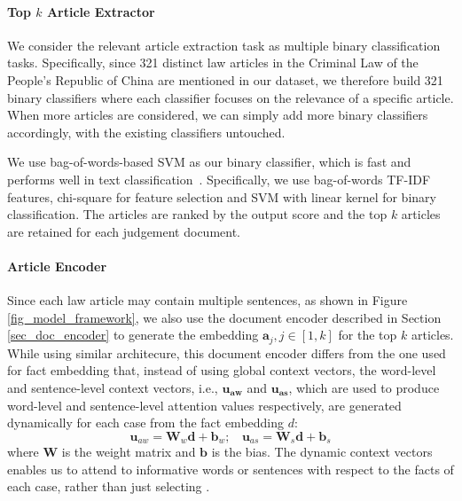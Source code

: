 \paragraph{Top $k$ Article Extractor}
\label{sec_article_extractor}
We consider the relevant article extraction task as multiple binary classification tasks. Specifically, since 321 distinct law articles in the Criminal Law of the People's Republic of China are mentioned in our dataset, we therefore build 321 binary classifiers where each classifier focuses on the relevance of a specific article. When more articles are considered,
we can simply add more binary classifiers accordingly, with the existing classifiers untouched.

We use bag-of-words-based SVM as our binary classifier, which is fast and performs well in text classification~\cite{joachims2002learning,wang2012baselines}. Specifically, we use bag-of-words TF-IDF features, chi-square for feature selection and SVM with linear kernel for binary classification. The articles are ranked by the output score and the top $k$ articles are retained for each judgement document.

\paragraph{Article Encoder}
\label{sec_article_encoder}
Since each law article may contain multiple sentences, as shown in Figure \ref{fig_model_framework}, we also use the document encoder described in Section \ref{sec_doc_encoder} to generate the embedding $\mathbf{a}_j, j\in [1, k]$ for the top $k$ articles. 
While using similar architecure, this document encoder differs from the one used for fact embedding that, instead of using global context vectors, the word-level and sentence-level context vectors, i.e., $\mathbf{u_{aw}}$ and $\mathbf{u_{as}}$, which are used to produce word-level and sentence-level attention values respectively, are generated dynamically for each case from the fact embedding $d$:
\begin{equation}
\mathbf{u}_{aw} = \mathbf{W}_w \mathbf{d} + \mathbf{b}_w;\ \ \ \ \mathbf{u}_{as} = \mathbf{W}_s \mathbf{d} + \mathbf{b}_s
\label{eq_dynamic_context_vec}
\end{equation}
where $\mathbf{W}$ is the weight matrix and $\mathbf{b}$ is the bias. The dynamic context vectors enables us to attend to informative words or sentences with respect to the facts of each case, rather than just selecting .


